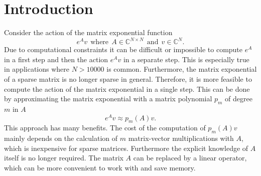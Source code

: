 \documentclass{scrartcl}
\begin{document}
\section{Introduction}
	Consider the action of the matrix exponential function 
	\[e^Av ~~\text{where}~~ A\in\mathbb{C}^{N\times N} ~~\text{and}~~ v\in\mathbb{C}^N.\] 
	Due to computational constraints it can be difficult or impossible to compute $e^A$ in a first step and then the action $e^Av$ in a separate step. This is especially true in applications where $N>10000$ is common. Furthermore, the matrix exponential of a sparse matrix is no longer sparse in general. Therefore, it is more feasible to compute the action of the matrix exponential in a single step. This can be done by approximating the matrix exponential with a matrix polynomial $p_m$ of degree $m$ in $A$
	\[e^Av \approx p_m(A)v.\]
	This approach has many benefits. The cost of the computation of $p_m(A)v$ mainly depends on the calculation of $m$ matrix-vector multiplications with $A$, which is inexpensive for sparse matrices. Furthermore the explicit knowledge of $A$ itself is no longer required. The matrix $A$ can be replaced by a linear operator, which can be more convenient to work with and save memory. 
	
\end{document}

